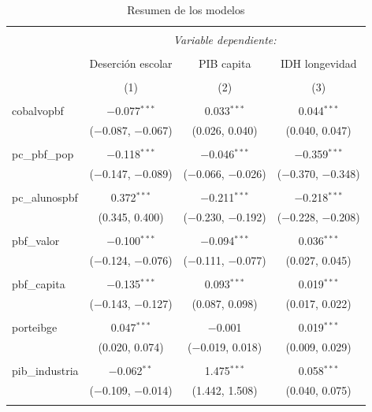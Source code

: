 \documentclass[
]{article}
\begin{document}
\newpage
\begin{table}[!htbp] \centering 
  \caption{Resumen de los modelos} 
  \label{} 
\begin{tabular}{@{\extracolsep{5pt}}lccc} 
\\[-1.8ex]\hline 
\hline \\[-1.8ex] 
 & \multicolumn{3}{c}{\textit{Variable dependiente:}} \\ 
\cline{2-4} 
\\[-1.8ex] & Deserción escolar & PIB capita & IDH longevidad \\ 
\\[-1.8ex] & (1) & (2) & (3)\\ 
\hline \\[-1.8ex] 
 cobalvopbf & $-$0.077$^{***}$ & 0.033$^{***}$ & 0.044$^{***}$ \\ 
  & ($-$0.087, $-$0.067) & (0.026, 0.040) & (0.040, 0.047) \\ 
  & & & \\ 
 pc\_pbf\_pop & $-$0.118$^{***}$ & $-$0.046$^{***}$ & $-$0.359$^{***}$ \\ 
  & ($-$0.147, $-$0.089) & ($-$0.066, $-$0.026) & ($-$0.370, $-$0.348) \\ 
  & & & \\ 
 pc\_alunospbf & 0.372$^{***}$ & $-$0.211$^{***}$ & $-$0.218$^{***}$ \\ 
  & (0.345, 0.400) & ($-$0.230, $-$0.192) & ($-$0.228, $-$0.208) \\ 
  & & & \\ 
 pbf\_valor & $-$0.100$^{***}$ & $-$0.094$^{***}$ & 0.036$^{***}$ \\ 
  & ($-$0.124, $-$0.076) & ($-$0.111, $-$0.077) & (0.027, 0.045) \\ 
  & & & \\ 
 pbf\_capita & $-$0.135$^{***}$ & 0.093$^{***}$ & 0.019$^{***}$ \\ 
  & ($-$0.143, $-$0.127) & (0.087, 0.098) & (0.017, 0.022) \\ 
  & & & \\ 
 porteibge & 0.047$^{***}$ & $-$0.001 & 0.019$^{***}$ \\ 
  & (0.020, 0.074) & ($-$0.019, 0.018) & (0.009, 0.029) \\ 
  & & & \\ 
 pib\_industria & $-$0.062$^{**}$ & 1.475$^{***}$ & 0.058$^{***}$ \\ 
  & ($-$0.109, $-$0.014) & (1.442, 1.508) & (0.040, 0.075) \\ 
  & & & \\ 

\end{tabular}
\end{table}
\end{document}
